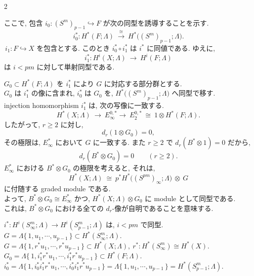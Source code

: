 \documentclass[10pt, leqno]{ltjsarticle} %
\newcommand{\gen}[1]{\{\,#1\,\}}       %
\numberwithin{equation}{section}
\theoremstyle{plain}
\theoremstyle{definition}
\theoremstyle{remark}
\begin{document}
\begin{paracol}{2}

\noindent
ここで, 包含 $i_0:(S^m)_{p-1}\hookrightarrow F$ が次の同型を誘導することを示す. 
\[
i_0^*:H^{*}(F;\Lambda)\ \xrightarrow{\;\cong\;}\ H^{*}\!\bigl((S^m)_{p-1};\Lambda\bigr) .
\]
$\,i_1:F\hookrightarrow X$ を包含とする. このとき $i_0^*\circ i_1^*$ は $i^*$ に同値である. 
ゆえに,
\[
i_1^*:H^{i}(X;\Lambda)\ \longrightarrow\ H^{i}(F;\Lambda)
\]
は $i<pm$ に対して単射同型である. 




\noindent
$G_0\subset H^{*}(F;\Lambda)$ を $i_1^*$ により $G$ に対応する部分群とする. \\
$G_0$ は $i_1^*$ の像に含まれ, $i_0^*$ は $G_0$ を,
$H^{*}\!\bigl((S^m)_{p-1};\Lambda\bigr)$ へ同型で移す. \\
injection homomorphism $i_1^*$ は, 次の写像に一致する. 
\[
H^{*}(X;\Lambda)\ \longrightarrow\ E_{\infty}^{0,*}
\longrightarrow\ E_{2}^{0,*}\ \cong\ 1\otimes H^{*}(F;\Lambda) .
\]
したがって, $r\ge2$ に対し,
\[
d_r(1\otimes G_0)=0,
\]
その極限は, $E_\infty^{*}$ において $G$ に一致する. 
また $r\ge2$ で $d_r(B^{*}\otimes 1)=0$ だから, 
\[
d_r(B^{*}\otimes G_0)=0\qquad(r\ge2).
\]
$E_\infty^{*}$ における $B^{*}\otimes G_0$ の極限を考えると, 
それは,
\[
H^{*}(X;\Lambda)\ \cong\ p^{*}H^{*}\!\bigl((S^{pm})_\infty;\Lambda\bigr)\ \otimes\ G
\]
に付随する graded module である. \\
よって, $B^{*}\otimes G_0 \cong E_\infty^{*}$ かつ,
$H^{*}(X;\Lambda)\otimes G_0$ に module として同型である. \\
これは, $B^{*}\otimes G_0$ における全ての $d_r$-像が自明であることを意味する. 

\switchcolumn

\noindent
\(i^*:H^i(S^m_\infty; \Lambda) \to H^i(S^m_{p-1}; \Lambda)\)
は, 
\(i<pm\) で同型.\\
\(G=\Lambda\gen{1, u_1,\cdots,u_{p-1}}
\subset H^*(S^m_\infty; \Lambda)\).\\
\(G=\Lambda\gen{1,r^*u_1,\cdots,r^*u_{p-1}}
\subset H^*(X; \Lambda),\ 
r^*: H^*(S^m_\infty) \cong H^*(X)\).\\
\(G_0 = \Lambda\gen{1, i_1^*r^*u_1,\cdots,i_1^*r^*u_{p-1}}
\subset H^*(F; \Lambda)\).\\
\(i_0^*=\Lambda\gen{1,i_0^*i_1^*r^*u_1,\cdots,i_0^*i_1^*r^*u_{p-1}}
= \Lambda\gen{1,u_1, \cdots,u_{p-1}}
= H^*(S^m_{p-1}; \Lambda)\).


\end{paracol}
\end{document}
